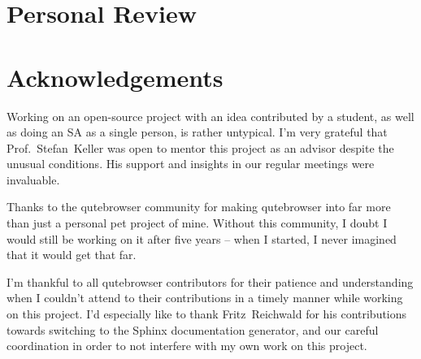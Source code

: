 \documentclass[a4paper,parskip=full]{scrreprt}
\begin{document}
% 
% 
% 



\section{Personal Review}

\section{Acknowledgements}
Working on an open-source project with an idea contributed by a student, as well
as doing an SA as a single person, is rather untypical. I'm very grateful that
Prof.~Stefan~Keller was open to mentor this project as an advisor despite the
unusual conditions. His support and insights in our regular meetings were
invaluable.

Thanks to the qutebrowser community for making qutebrowser into far more than
just a personal pet project of mine. Without this community, I doubt I would
still be working on it after five years -- when I started, I never imagined that
it would get that far.

I'm thankful to all qutebrowser contributors for their patience and
understanding when I couldn't attend to their contributions in a timely manner
while working on this project. I'd especially like to thank Fritz~Reichwald for
his contributions towards switching to the Sphinx documentation generator, and
our careful coordination in order to not interfere with my own work on this
project.
\end{document}
